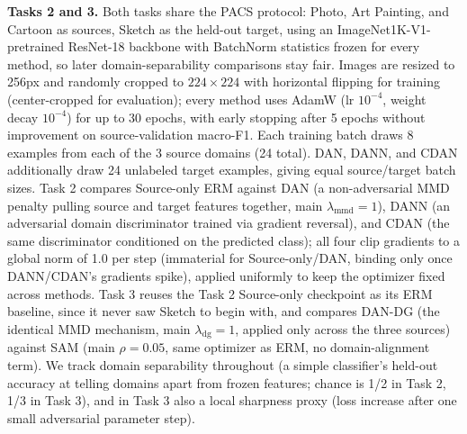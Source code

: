 \documentclass{article}
\begin{document}
\textbf{Tasks 2 and 3.} Both tasks share the PACS \cite{li2017pacs} protocol: Photo, Art Painting,
and Cartoon as sources, Sketch as the held-out target, using an ImageNet1K-V1-pretrained ResNet-18
backbone with BatchNorm statistics frozen for every method, so later domain-separability comparisons
stay fair. Images are resized to 256px and randomly cropped to $224{\times}224$ with horizontal
flipping for training (center-cropped for evaluation); every method uses AdamW (lr $10^{-4}$, weight
decay $10^{-4}$) for up to 30 epochs, with early stopping after 5 epochs without improvement on
source-validation macro-F1. Each training batch draws 8 examples from each of the 3 source domains
(24 total). DAN, DANN, and CDAN additionally draw 24 unlabeled target examples, giving equal
source/target batch sizes. Task 2 compares Source-only ERM against DAN \cite{long2015dan} (a
non-adversarial MMD penalty pulling source and target features together, main
$\lambda_{\mathrm{mmd}}{=}1$), DANN \cite{ganin2016dann} (an adversarial domain discriminator
trained via gradient reversal), and CDAN \cite{long2018cdan} (the same discriminator conditioned on
the predicted class); all four clip gradients to a global norm of 1.0 per step (immaterial for
Source-only/DAN, binding only once DANN/CDAN's gradients spike), applied uniformly to keep the
optimizer fixed across methods.
Task 3 reuses the Task 2 Source-only checkpoint as its ERM baseline, since it
never saw Sketch to begin with, and compares DAN-DG (the identical MMD mechanism, main
$\lambda_{\mathrm{dg}}{=}1$, applied only across the three sources) against SAM
\cite{foret2021sam} (main $\rho{=}0.05$, same optimizer as ERM, no domain-alignment term). We track
domain separability throughout (a simple classifier's held-out accuracy at telling domains apart
from frozen features; chance is 1/2 in Task 2, 1/3 in Task 3), and in Task 3 also a local sharpness
proxy (loss increase after one small adversarial parameter step).
\end{document}
